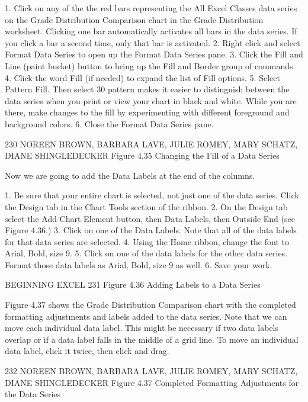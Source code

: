 1. Click on any of the the red bars representing the All Excel Classes data series on the Grade
Distribution Comparison chart in the Grade Distribution worksheet. Clicking one bar
automatically activates all bars in the data series. If you click a bar a second time, only that bar is
activated.
2. Right click and select Format Data Series to open up the Format Data Series pane.
3. Click the Fill and Line (paint bucket) button to bring up the Fill and Border group of
commands.
4. Click the word Fill (if needed) to expand the list of Fill options.
5. Select Pattern Fill. Then select 30%
pattern makes it easier to distinguish between the data series when you print or view your chart
in black and white. While you are there, make changes to the fill by experimenting with different
foreground and background colors.
6. Close the Format Data Series pane.




230 NOREEN BROWN, BARBARA LAVE, JULIE ROMEY, MARY SCHATZ, DIANE SHINGLEDECKER
Figure 4.35 Changing the Fill of a Data Series


Now we are going to add the Data Labels at the end of the columns.

1. Be sure that your entire chart is selected, not just one of the data series. Click the Design tab in
the Chart Tools section of the ribbon.
2. On the Design tab select the Add Chart Element button, then Data Labels, then Outside
End (see Figure 4.36.)
3. Click on one of the Data Labels. Note that all of the data labels for that data series are selected.
4. Using the Home ribbon, change the font to Arial, Bold, size 9.
5. Click on one of the data labels for the other data series. Format those data labels as Arial, Bold,
size 9 as well.
6. Save your work.




BEGINNING EXCEL 231
Figure 4.36 Adding Labels to a Data Series


Figure 4.37 shows the Grade Distribution Comparison chart with the completed formatting
adjustments and labels added to the data series. Note that we can move each individual data label. This
might be necessary if two data labels overlap or if a data label falls in the middle of a grid line. To move
an individual data label, click it twice, then click and drag.




232 NOREEN BROWN, BARBARA LAVE, JULIE ROMEY, MARY SCHATZ, DIANE SHINGLEDECKER
Figure 4.37 Completed Formatting Adjustments for the Data Series




